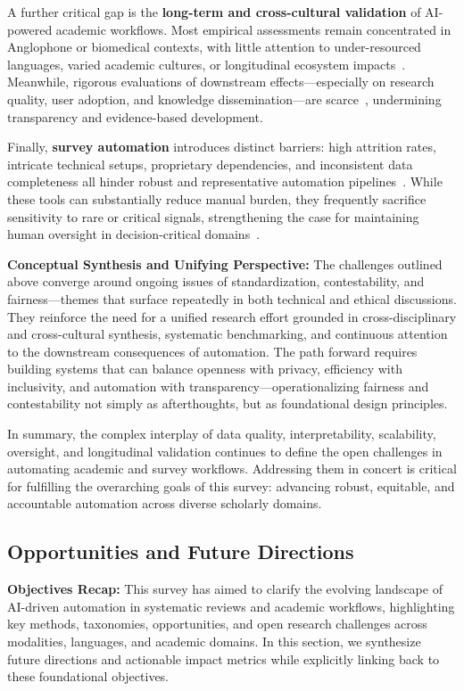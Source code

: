 \documentclass[sigconf]{acmart}
\begin{document}
A further critical gap is the \textbf{long-term and cross-cultural validation} of AI-powered academic workflows. Most empirical assessments remain concentrated in Anglophone or biomedical contexts, with little attention to under-resourced languages, varied academic cultures, or longitudinal ecosystem impacts~\cite{ref110,ref117,ref105}. Meanwhile, rigorous evaluations of downstream effects---especially on research quality, user adoption, and knowledge dissemination---are scarce~\cite{ref73,ref110,ref117}, undermining transparency and evidence-based development.

Finally, \textbf{survey automation} introduces distinct barriers: high attrition rates, intricate technical setups, proprietary dependencies, and inconsistent data completeness all hinder robust and representative automation pipelines~\cite{ref81,ref117}. While these tools can substantially reduce manual burden, they frequently sacrifice sensitivity to rare or critical signals, strengthening the case for maintaining human oversight in decision-critical domains~\cite{ref110,ref117}.

\textbf{Conceptual Synthesis and Unifying Perspective:} The challenges outlined above converge around ongoing issues of standardization, contestability, and fairness---themes that surface repeatedly in both technical and ethical discussions. They reinforce the need for a unified research effort grounded in cross-disciplinary and cross-cultural synthesis, systematic benchmarking, and continuous attention to the downstream consequences of automation. The path forward requires building systems that can balance openness with privacy, efficiency with inclusivity, and automation with transparency---operationalizing fairness and contestability not simply as afterthoughts, but as foundational design principles. 

In summary, the complex interplay of data quality, interpretability, scalability, oversight, and longitudinal validation continues to define the open challenges in automating academic and survey workflows. Addressing them in concert is critical for fulfilling the overarching goals of this survey: advancing robust, equitable, and accountable automation across diverse scholarly domains.

\subsection{Opportunities and Future Directions}

\textbf{Objectives Recap:} This survey has aimed to clarify the evolving landscape of AI-driven automation in systematic reviews and academic workflows, highlighting key methods, taxonomies, opportunities, and open research challenges across modalities, languages, and academic domains. In this section, we synthesize future directions and actionable impact metrics while explicitly linking back to these foundational objectives.
\end{document}
